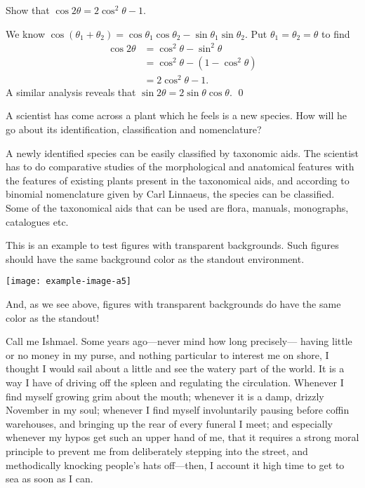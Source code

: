 \documentclass{article}
\begin{document}
\begin{standout}
\begin{example}
  Show that $\cos{2\theta} = 2\cos^{2}{\theta} - 1$.
\end{example}
\begin{solution}
  We know $\cos(\theta_{1} + \theta_{2}) = \cos{\theta_{1}}\cos{\theta_{2}} - \sin{\theta_{1}}\sin{\theta_{2}}$.
  Put $\theta_{1} = \theta_{2} = \theta$ to find
  \begin{equation*}
    \begin{aligned}
      \cos{2\theta} &= \cos^{2}{\theta} - \sin^{2}{\theta}\\
         &= \cos^{2}{\theta} - (1-\cos^{2}\theta)\\
         &= 2\cos^{2}{\theta} - 1.
    \end{aligned}
  \end{equation*}
  A similar analysis reveals that $\sin2\theta = 2\sin{\theta}\cos{\theta}$.
  \qed
\end{solution}
\begin{example}
  A scientist has come across a plant which he feels is a new species. How will he go about its identification, classification and nomenclature?
\end{example}
\begin{solution}
  A newly identified species can be easily classified by taxonomic aids. The scientist has to do comparative studies of the morphological and anatomical features with the features of existing plants present in the taxonomical aids, and according to binomial nomenclature given by Carl Linnaeus, the species can be classified. Some of the taxonomical aids that can be used are flora, manuals, monographs, catalogues etc.
\end{solution}
\begin{example}
  This is an example to test figures with transparent backgrounds.
  Such figures should have the same background color as the standout environment.
  \begin{center}
    \texttt{[image: example-image-a5]}
  \end{center}
  And, as we see above, figures with transparent backgrounds do have the same color as the standout!
\end{example}
\end{standout}

Call me Ishmael.
Some years ago---never mind how long precisely---
having little or no money in my purse, and nothing particular to
interest me on shore, I thought I would sail about a little and see
the watery part of the world.
It is a way I have of driving off the
spleen and regulating the circulation.
Whenever I find myself growing grim about the mouth; whenever it is a damp, drizzly
November in my soul; whenever I find myself involuntarily pausing
before coffin warehouses, and bringing up the rear of every funeral
I meet; and especially whenever my hypos get such an upper hand of me,
that it requires a strong moral principle to prevent me from
deliberately stepping into the street, and methodically knocking
people's hats off---then, I account it high time to get to sea as
soon as I can.
\end{document}
